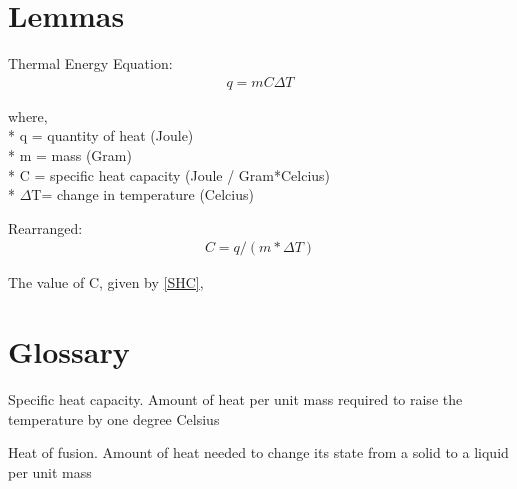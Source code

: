 \documentclass[oneside,12pt]{report}
\begin{document}
%
%
%
%
%
%


\appendix
{}

\chapter{Lemmas}\label{Lemma}
\vspace{12pt} 

Thermal Energy Equation:
\begin{align}
q=mC\Delta{}T 
\end{align}

\noindent where,
\\* \indent q = quantity of heat (Joule) 
\\* \indent m = mass (Gram)
\\* \indent C = specific heat capacity (Joule / Gram*Celcius)
\\* \indent $\Delta$T= change in temperature (Celcius)

\vspace{24pt}
\noindent Rearranged:
\begin{align}
C= q/(m*\Delta{} T) \label{SHC}
\end{align}

\noindent The value of C, given by \ref{SHC}, 


\chapter{Glossary}\label{Glossary}

\vspace{12pt}


\noindent Specific heat capacity. 
\indent Amount of heat per unit mass required to raise the temperature by one degree Celsius
\vspace{12pt}

\noindent Heat of fusion. 
\indent Amount of heat needed to change its state from a solid to a liquid per unit mass



\end{document}
